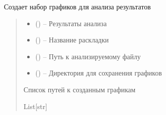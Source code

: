 \documentclass[a4paper,11pt,russian,openany,oneside]{sphinxmanual}
\begin{document}
\begin{savenotes}\begin{fulllineitems}
\label{\detokenize{_autosummary/data_module.make_export_plot:data_module.make_export_plot.create_analysis_charts}}
\pysigstartsignatures
\pysiglinewithargsret
{}
{\sphinxparamcomma {}\sphinxparamcomma {}\sphinxparamcomma {}}
{}
\pysigstopsignatures
\sphinxAtStartPar
Создает набор графиков для анализа результатов
\begin{quote}\begin{description}
\begin{itemize}
\item {} 
\sphinxAtStartPar
{} (\sphinxstyleliteralemphasis{\sphinxupquote{{[}}}\sphinxstyleliteralemphasis{\sphinxupquote{, }}\sphinxstyleliteralemphasis{\sphinxupquote{{]}}}) – Результаты анализа

\item {} 
\sphinxAtStartPar
{} () – Название раскладки

\item {} 
\sphinxAtStartPar
{} () – Путь к анализируемому файлу

\item {} 
\sphinxAtStartPar
{} () – Директория для сохранения графиков

\end{itemize}

\sphinxAtStartPar
Список путей к созданным графикам

\sphinxAtStartPar
List{[}str{]}

\end{description}\end{quote}

\end{fulllineitems}\end{savenotes}
\end{document}
